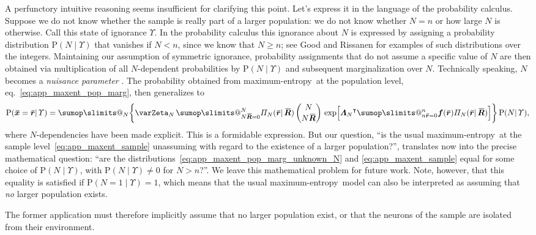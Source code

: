 \documentclass{article}
\makeatletter
\theoremstyle{remark}
\theoremstyle{innote}
\def\sum{\DOTSI\sumop\slimits@}
\newcommand*{\citep}{\parencites}
\renewcommand*{\cite}{\citep}
\renewcommand*{\|}{\mathpunct{|}}%
\renewcommand{\ge}{\geqslant}%
\newcommand*{\p}{\mathrm{P}}%
\newcommand*{\eqn}{eq.}%
\newcommand*{\T}{^\intercal}%
\theoremstyle{simple}
\newcommand*{\widebar}[1]{{\mkern1.5mu\skew{2}\overline{\mkern-1.5mu#1\mkern-1.5mu}\mkern 1.5mu}}
\newcommand*{\av}{\widebar} %
\newcommand*{\sav}{\widebar} %
\newcommand*{\ypp}{\varPi}
\newcommand*{\yxx}{x}%
\newcommand*{\yx}{\bm{\yxx}}%
\newcommand*{\yxs}{\sav{\yx}}%
\newcommand*{\yr}{\bm{r}}%
\newcommand*{\yrs}{\sav{\yr}}%
\newcommand*{\yR}{\bm{R}}%
\newcommand*{\yRf}{\av{\yR}}%
\newcommand*{\yHd}{\varUpsilon}
\newcommand*{\yf}{\bm{f}}
\newcommand*{\yL}{\bm{\varLambda}}
\newcommand*{\yK}{\varZeta}
\newcommand*{\me}{maximum-entropy}
\makeatother
\begin{document}
A perfunctory intuitive reasoning seems insufficient for clarifying this
point. Let's express it in the language of the probability calculus.
Suppose we do not know whether the sample is really part of a larger
population: we do not know whether $N=n$ or how large $N$ is otherwise.
Call this state of ignorance $\yHd$. In the probability calculus this
ignorance about $N$ is expressed by assigning a probability distribution
$\p(N \| \yHd)$ that vanishes if $N<n$, since we know that $N\ge n$; see
Good \cite{good1965,good1967b} and Rissanen \cite{rissanen1983} for
examples of such distributions over the integers. Maintaining our
assumption of symmetric ignorance, probability assignments that do not
assume a specific value of $N$ are then obtained via multiplication of all
$N$-dependent probabilities by $\p(N \| \yHd)$ and subsequent
marginalization over $N$. Technically speaking, $N$ becomes a
\emph{nuisance parameter}
\cite{jaynes1994_r2003,lindley1965b_r2008,bernardoetal1994_r2000}. The
probability obtained from \me\ at the population level,
\eqn~\eqref{eq:app_maxent_pop_marg}, then generalizes to
\begin{equation}
  \label{eq:app_maxent_pop_marg_unknown_N}
  \p(\yxs = \yrs \| \yHd)  = \sum_N \biggl\{\yK_N\, 
  \sum_{N\yRf=0}^N \ypp_N(\yrs \|\yRf)
\,
  \binom{N}{N \yRf}\,\exp\Bigl[{\yL_N}\T
  \sum_{n\yrs=0}^n \yf(\yrs)\ypp_N(\yrs\|\yRf)\Bigr]\biggr\}
  \,\p(N \| \yHd),
\end{equation}
where $N$-dependencies have been made explicit. This is a formidable
expression. But our question, \enquote{is the usual \me\ at the sample
  level~\eqref{eq:app_maxent_sample} unassuming with regard to the
  existence of a larger population?}, translates now into the precise
mathematical question: \enquote{are the
distributions~\eqref{eq:app_maxent_pop_marg_unknown_N} and
\eqref{eq:app_maxent_sample} equal for some choice of $\p(N \| \yHd)$, with
$\p(N \| \yHd)\ne 0$ for $N>n$?}. We leave this mathematical problem for
future work. Note, however, that this equality is satisfied if
$\p(N=1 \| \yHd)=1$, which means that the usual \me\ model can also be
interpreted as assuming that \emph{no} larger population exists.


\iffalse
The former application must therefore implicitly assume that no
larger population exist, or that the neurons of the sample are isolated
from their environment.
\end{document}
